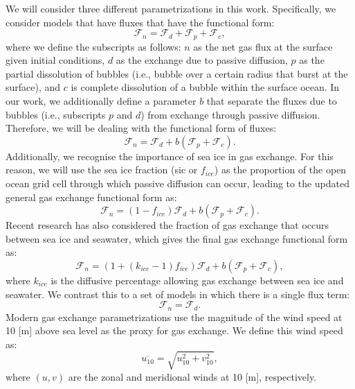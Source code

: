 \documentclass[11pt]{article}
\newcommand{\F}{\mathcal{F}}  %
\begin{document}
We will consider three different parametrizations in this work. 
Specifically, we consider models that have fluxes that have the functional form:
\begin{equation}
	\F_n = \F_d + \F_p + \F_c,
	\label{eq:flux_diff_partial}
\end{equation}
where we define the subscripts as follows: $n$ as the net gas flux at the surface given initial conditions, $d$ as the exchange due to passive diffusion, $p$ as the partial dissolution of bubbles  (i.e., bubble over a certain radius that burst at the surface), and $c$ is complete dissolution of a bubble within the surface ocean.
In our work, we additionally define a parameter $b$ that separate the fluxes due to bubbles (i.e., subscripts $p$ and  $d$) from exchange through passive diffusion.
Therefore, we will be dealing with the functional form of fluxes:
\begin{equation}
	\F_n = \F_d + b\left(\F_p + \F_c\right).
\end{equation}
Additionally, we recognise the importance of sea ice in gas exchange.
For this reason, we will use the sea ice fraction (sic or $f_{ice}$) as the proportion of the open ocean grid cell through which passive diffusion can occur, leading to the updated general gas exchange functional form as:
\begin{equation}
	\F_n = \left(1 - f_{ice}\right)\F_d + b\left(\F_p + \F_c\right).
\end{equation}
Recent research has also considered the fraction of gas exchange that occurs between sea ice and seawater, which gives the final gas exchange functional form as:
\begin{equation}
	\F_n = \left(1 + \left(k_{ice} - 1\right)f_{ice}\right)\F_d + b\left(\F_p + \F_c\right),
\end{equation}
where $k_{ice}$ is the diffusive percentage allowing gas exchange between sea ice and seawater.  
We contrast this to a set of models in which there is a single flux term:
\begin{equation}
	\F_n = \F_d.
	\label{eq:flux_diff_total}
\end{equation}
Modern gas exchange parametrizations use the magnitude of the wind speed at 10 [m] above sea level as the proxy for gas exchange.
We define this wind speed as:
\begin{equation}
	\overline{u_{10}} = \sqrt{u_{10}^2 + v_{10}^2},
	\label{eq:u10}
\end{equation}
where $\left(u, v\right)$ are the zonal and meridional winds at 10 [m], respectively. 
\end{document}
